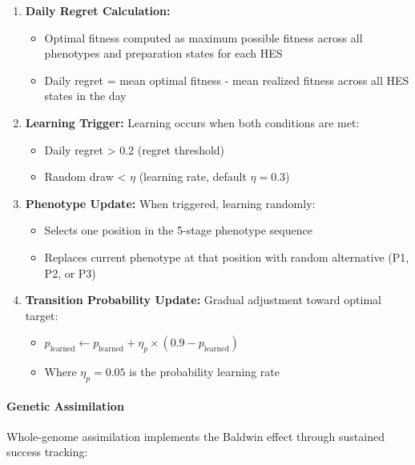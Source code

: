 \documentclass[aps,pre,twocolumn,floatfix,nofootinbib,amsmath,amssymb]{revtex4-2}
\begin{document}
\begin{enumerate}
\item \textbf{Daily Regret Calculation:}
    \begin{itemize}
    \item Optimal fitness computed as maximum possible fitness across all phenotypes and preparation states for each HES
    \item Daily regret = mean optimal fitness - mean realized fitness across all HES states in the day
    \end{itemize}

\item \textbf{Learning Trigger:} Learning occurs when both conditions are met:
    \begin{itemize}
    \item Daily regret > 0.2 (regret threshold)
    \item Random draw < $\eta$ (learning rate, default $\eta = 0.3$)
    \end{itemize}

\item \textbf{Phenotype Update:} When triggered, learning randomly:
    \begin{itemize}
    \item Selects one position in the 5-stage phenotype sequence
    \item Replaces current phenotype at that position with random alternative (P1, P2, or P3)
    \end{itemize}

\item \textbf{Transition Probability Update:} Gradual adjustment toward optimal target:
    \begin{itemize}
    \item $p_{\text{learned}} \leftarrow p_{\text{learned}} + \eta_p \times (0.9 - p_{\text{learned}})$
    \item Where $\eta_p = 0.05$ is the probability learning rate
    \end{itemize}
\end{enumerate}

\paragraph{Genetic Assimilation}

Whole-genome assimilation implements the Baldwin effect through sustained success tracking:
\end{document}
